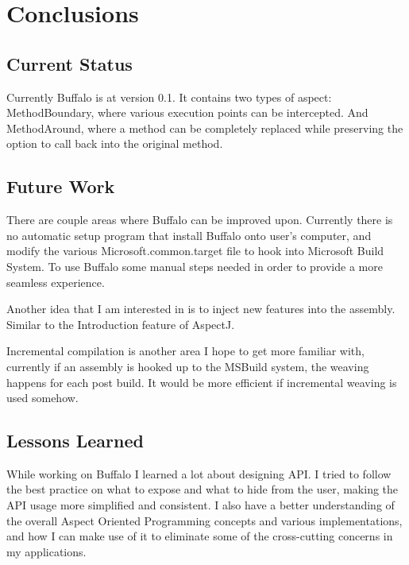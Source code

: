 \chapter{Conclusions}
\section{Current Status}

Currently Buffalo is at version 0.1. It contains two types of aspect: MethodBoundary, where various execution points can be intercepted. And MethodAround, where a method can be completely replaced while preserving the option to call back into the original method.

\section{Future Work}

There are couple areas where Buffalo can be improved upon. Currently there is no automatic setup program that install Buffalo onto user’s computer, and modify the various Microsoft.common.target file to hook into Microsoft Build System. To use Buffalo some manual steps needed in order to provide a more seamless experience.

Another idea that I am interested in is to inject new features into the assembly. Similar to the Introduction feature of AspectJ.

Incremental compilation is another area I hope to get more familiar with, currently if an assembly is hooked up to the MSBuild system, the weaving happens for each post build. It would be more efficient if incremental weaving is used somehow.

\section{Lessons Learned}

While working on Buffalo I learned a lot about designing API. I tried to follow the best practice on what to expose and what to hide from the user, making the API usage more simplified and consistent. I also have a better understanding of the overall Aspect Oriented Programming concepts and various implementations, and how I can make use of it to eliminate some of the cross-cutting concerns in my applications.
